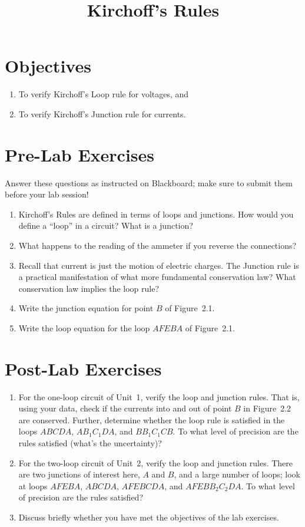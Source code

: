 \documentclass[12pt]{article}
\title{Kirchoff's Rules}
\author{}
\date{}
\begin{document}
\maketitle

\section{Objectives}
\label{sec:objectives}

\begin{enumerate}
\item To verify Kirchoff's Loop rule for voltages, and
\item To verify Kirchoff's Junction rule for currents.
\end{enumerate}


\section*{Pre-Lab Exercises}

Answer these questions as instructed on Blackboard; make sure to
submit them before your lab session!

\begin{enumerate}
\item Kirchoff's Rules are defined in terms of loops and junctions.
  How would you define a ``loop'' in a circuit?  What is a junction?
\item What happens to the reading of the ammeter if you reverse the
  connections?
\item Recall that current is just the motion of electric charges.  The
  Junction rule is a practical manifestation of what more fundamental
  conservation law?  What conservation law implies the loop rule?
\item Write the junction equation for point $B$ of Figure~2.1.
\item Write the loop equation for the loop $AFEBA$ of Figure~2.1.
\end{enumerate}

\newpage

\section*{Post-Lab Exercises}

\begin{enumerate}
\item For the one-loop circuit of Unit~1, verify the loop and junction
  rules.  That is, using your data, check if the currents into and out
  of point $B$ in Figure~2.2 are conserved.  Further, determine
  whether the loop rule is satisfied in the loops $ABCDA$,
  $AB_1C_1DA$, and $BB_1C_1CB$.  To what level of precision are the
  rules satisfied (what's the uncertainty)?
\item For the two-loop circuit of Unit~2, verify the loop and junction
  rules. There are two junctions of interest here, $A$ and $B$, and a
  large number of loops; look at loops $AFEBA$, $ABCDA$, $AFEBCDA$,
  and $AFEBB_2C_2DA$.
  To what level of precision are the rules satisfied?
\item Discuss briefly whether you have met the objectives of the lab
  exercises. 
\end{enumerate}
\end{document}
